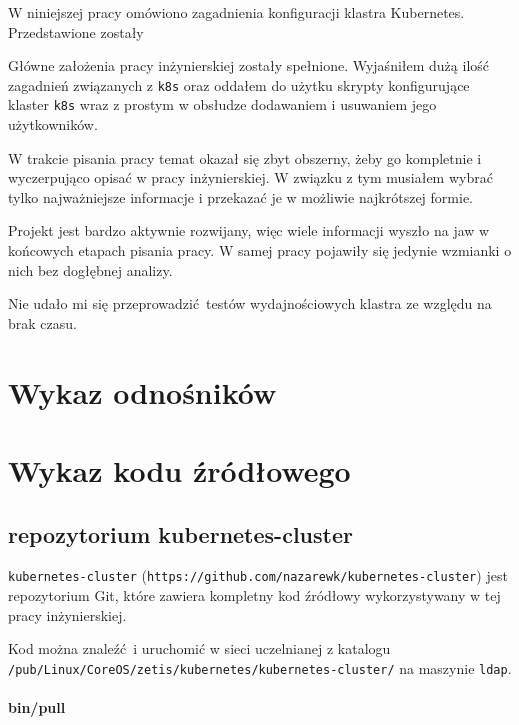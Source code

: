 \documentclass[a4paper,12pt,twoside,openany]{report}
\newcommand{\passthrough}[1]{#1}
\begin{document}
W niniejszej pracy omówiono zagadnienia konfiguracji klastra Kubernetes.
Przedstawione zostały

Główne założenia pracy inżynierskiej zostały spełnione. Wyjaśniłem dużą
ilość zagadnień związanych z \passthrough{\lstinline!k8s!} oraz oddałem
do użytku skrypty konfigurujące klaster \passthrough{\lstinline!k8s!}
wraz z prostym w obsłudze dodawaniem i usuwaniem jego użytkowników.

W trakcie pisania pracy temat okazał się zbyt obszerny, żeby go
kompletnie i wyczerpująco opisać w pracy inżynierskiej. W związku z tym
musiałem wybrać tylko najważniejsze informacje i przekazać je w możliwie
najkrótszej formie.

Projekt jest bardzo aktywnie rozwijany, więc wiele informacji wyszło na
jaw w końcowych etapach pisania pracy. W samej pracy pojawiły się
jedynie wzmianki o nich bez dogłębnej analizy.

Nie udało mi się przeprowadzić~testów wydajnościowych klastra ze względu
na brak czasu. \appendix

\hypertarget{wykaz-odnoux15bnikuxf3w}{%
\chapter{Wykaz odnośników}\label{wykaz-odnoux15bnikuxf3w}}

\theendnotes

\hypertarget{wykaz-kodu-ux17aruxf3dux142owego}{%
\chapter{Wykaz kodu źródłowego}\label{wykaz-kodu-ux17aruxf3dux142owego}}

\hypertarget{repozytorium-kubernetes-cluster}{%
\section{repozytorium
kubernetes-cluster}\label{repozytorium-kubernetes-cluster}}

\passthrough{\lstinline!kubernetes-cluster!}
(\passthrough{\lstinline!https://github.com/nazarewk/kubernetes-cluster!})
jest repozytorium Git, które zawiera kompletny kod źródłowy
wykorzystywany w tej pracy inżynierskiej.

Kod można znaleźć~i uruchomić w sieci uczelnianej z katalogu
\passthrough{\lstinline!/pub/Linux/CoreOS/zetis/kubernetes/kubernetes-cluster/!}
na maszynie \passthrough{\lstinline!ldap!}.

\hypertarget{binpull}{%
\subsubsection{bin/pull}\label{binpull}}
\end{document}
